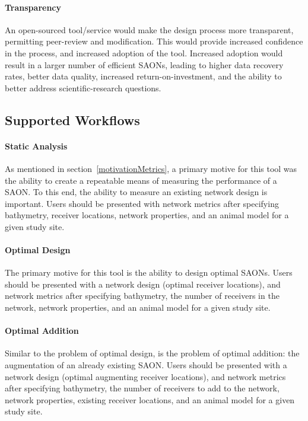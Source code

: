 \paragraph{Transparency}
\label{motivationTransparency}
An open-sourced tool/service would make the design process more transparent, permitting peer-review and modification.  This would provide increased confidence in the process, and increased adoption of the tool.  Increased adoption would result in a larger number of efficient SAONs, leading to higher data recovery rates, better data quality, increased return-on-investment, and the ability to better address scientific-research questions.


\subsection{Supported Workflows}
\paragraph{Static Analysis}
As mentioned in section~\ref{motivationMetrics}, a primary motive for this tool was the ability to create a repeatable means of measuring the performance of a SAON.  To this end, the ability to measure an existing network design is important.  Users should be presented with network metrics after specifying bathymetry, receiver locations, network properties, and an animal model for a given study site.


\paragraph{Optimal Design}
The primary motive for this tool is the ability to design optimal SAONs.  Users should be presented with a network design (optimal receiver locations), and network metrics after specifying bathymetry, the number of receivers in the network, network properties, and an animal model for a given study site.


\paragraph{Optimal Addition}
Similar to the problem of optimal design, is the problem of optimal addition: the augmentation of an already existing SAON.  Users should be presented with a network design (optimal augmenting receiver locations), and network metrics after specifying bathymetry, the number of receivers to add to the network, network properties, existing receiver locations, and an animal model for a given study site.


